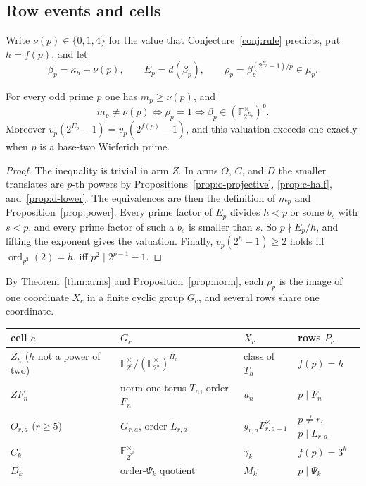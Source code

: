 \subsection{Row events and cells}\label{sec:model-cells}

Write $\nu(p)\in\{0,1,4\}$ for the value that Conjecture~\ref{conj:rule}
predicts, put $h=f(p)$, and let
\[
 \beta_p=\kappa_h+\nu(p),\qquad E_p=d(\beta_p),\qquad
 \rho_p=\beta_p^{(2^{E_p}-1)/p}\in\mu_p .
\]

\begin{proposition}\label{prop:model-row}
For every odd prime $p$ one has $m_p\geq\nu(p)$, and
\[
 m_p\neq\nu(p)\iff\rho_p=1\iff\beta_p\in(\mathbb F_{2^{E_p}}^{\times})^p .
\]
Moreover $v_p(2^{E_p}-1)=v_p(2^{f(p)}-1)$, and this valuation exceeds one
exactly when $p$ is a base-two Wieferich prime.
\end{proposition}

\begin{proof}
The inequality is trivial in arm $Z$.  In arms $O$, $C$, and $D$ the
smaller translates are $p$-th powers by Propositions~\ref{prop:o-projective},
\ref{prop:c-half}, and~\ref{prop:d-lower}.  The equivalences are then the
definition of $m_p$ and Proposition~\ref{prop:power}.  Every prime factor of
$E_p$ divides $h<p$ or some $b_s$ with $s<p$, and every prime factor of such
a $b_s$ is smaller than $s$.  So $p\nmid E_p/h$, and lifting the exponent
gives the valuation.  Finally, $v_p(2^h-1)\geq2$ holds iff
$\operatorname{ord}_{p^2}(2)=h$, iff $p^2\mid2^{p-1}-1$.
\end{proof}

By Theorem~\ref{thm:arms} and Proposition~\ref{prop:norm}, each $\rho_p$ is
the image of one coordinate $X_c$ in a finite cyclic group $G_c$, and several
rows share one coordinate.

\begin{center}
\small
\begin{tabular}{llll}
\hline
cell $c$ & $G_c$ & $X_c$ & rows $P_c$\\
\hline
$Z_h$ ($h$ not a power of two) &
      $\mathbb F_{2^h}^{\times}/(\mathbb F_{2^h}^{\times})^{\Pi_h}$
      & class of $T_h$ & $f(p)=h$\\
$ZF_n$ & norm-one torus $T_n$, order $F_n$ & $u_n$ & $p\mid F_n$\\
$O_{r,a}$ ($r\geq5$) & $G_{r,a}$, order $L_{r,a}$
      & $y_{r,a}F_{r,a-1}^{\times}$ & $p\ne r$, $p\mid L_{r,a}$\\
$C_k$ & $\mathbb F_{2^{3^k}}^{\times}$ & $\gamma_k$ & $f(p)=3^k$\\
$D_k$ & order-$\Psi_k$ quotient & $M_k$ & $p\mid\Psi_k$\\
\hline
\end{tabular}
\end{center}

